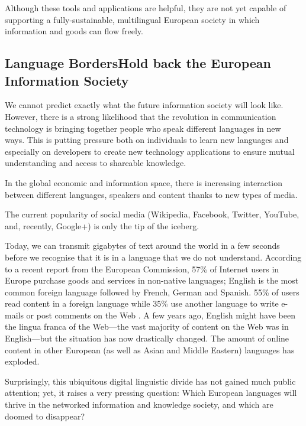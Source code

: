 \documentclass[]{../../metanetpaper}
\begin{document}
\begin{multicols}{2}
Although these tools and applications are helpful, they are not yet capable of supporting a fully-sustainable, multilingual European society in which information and goods can flow freely.

\subsection[Language Borders Hold back the European Information Society]{Language Borders\newline Hold back the European Information Society}

We cannot predict exactly what the future information society will look like. However, there is a strong likelihood that the revolution in communication technology is bringing together people who speak different languages in new ways. This is putting pressure both on individuals to learn new languages and especially on developers to create new technology applications to ensure mutual understanding and access to shareable knowledge. 

In the global economic and information space, there is increasing interaction between different languages, speakers and content thanks to new types of media. 

The current popularity of social media (Wikipedia, Facebook, Twitter, YouTube, and, recently, Google+) is only the tip of the iceberg.


Today, we can transmit gigabytes of text around the world in a few seconds before we recognise that it is in a language that we do not understand. According to a recent report from the European Commission, 57\% of Internet users in Europe purchase goods and services in non-native languages; English is the most common foreign language followed by French, German and Spanish. 55\% of users read content in a foreign language while 35\% use another language to write e-mails or post comments on the Web \cite{EC1}. A few years ago, English might have been the lingua franca of the Web—the vast majority of content on the Web was in English—but the situation has now drastically changed. The amount of online content in other European (as well as Asian and Middle Eastern) languages has exploded.

Surprisingly, this ubiquitous digital linguistic divide has not gained much public attention; yet, it raises a very pressing question: Which European languages will thrive in the networked information and knowledge society, and which are doomed to disappear?


\end{multicols}
\end{document}
